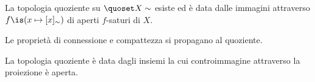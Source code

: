 \begin{fat}
	La topologia quoziente su $\quoset X\sim$ esiste
	ed è data dalle immagini attraverso $f\is(x\mapsto[x]_\sim)$ di aperti $f$-saturi di $X$.
\end{fat}

\begin{fat}
	Le proprietà di connessione e compattezza si propagano al quoziente.
\end{fat}

\begin{ex}
	La topologia quoziente è data dagli insiemi la cui controimmagine attraverso la proiezione è aperta.
\end{ex}

%
%
%
%
%
